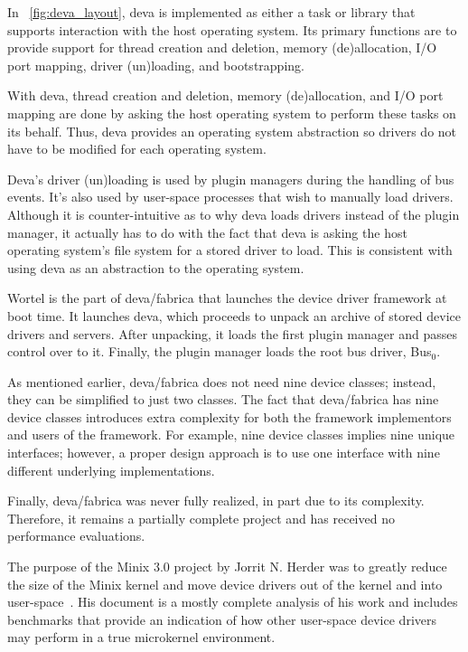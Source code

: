In \figurename~\ref{fig:deva_layout}, {\important deva} is implemented as
either a task or library that supports interaction with the host operating
system.  Its primary functions are to provide support for thread creation
and deletion, memory (de)allocation, I/O port mapping, driver (un)loading,
and bootstrapping.

With {\important deva}, thread creation and deletion, memory (de)allocation,
and I/O port mapping are done by asking the host operating system to perform
these tasks on its behalf.  Thus, {\important deva} provides an operating
system abstraction so drivers do not have to be modified for each operating
system.

Deva's driver (un)loading is used by plugin managers during
the handling of bus events.  It's also used by user-space processes that
wish to manually load drivers.  Although it is counter-intuitive as to
why deva loads drivers instead of the plugin manager, it actually has to do
with the fact that deva is asking the host operating system's file system
for a stored driver to load.  This is consistent with using deva as an
abstraction to the operating system.


{\important Wortel} is the part of deva/fabrica that launches the device
driver framework at boot time.  It launches {\important deva}, which
proceeds to unpack an archive of stored device drivers and servers.
After unpacking, it loads the first {\important plugin manager} and passes
control over to it.  Finally, the plugin manager loads the root bus driver,
Bus$_0$.


As mentioned earlier, deva/fabrica does not need nine device classes; instead,
they can be simplified to just two classes.  The fact that deva/fabrica has
nine device classes introduces extra complexity for both the framework
implementors and users of the framework.  For example, nine device classes
implies nine unique interfaces; however, a proper design approach is to
use one interface with nine different underlying implementations.

Finally, deva/fabrica was never fully realized, in part due to its
complexity.  Therefore, it remains a partially complete project and
has received no performance evaluations.


The purpose of the Minix 3.0 project by Jorrit N. Herder was to greatly
reduce the size of the Minix kernel and move device drivers out of the
kernel and into user-space~\cite{herder2005}.  His document is a mostly
complete analysis of his work and includes benchmarks that provide an
indication of how other user-space device drivers may perform in a true
microkernel environment.

